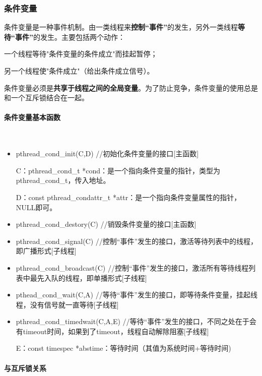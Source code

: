 \documentclass[UTF8]{article}%
\begin{document}
\subsubsection{条件变量}

条件变量是一种事件机制。由一类线程来\textbf{控制“事件”}的发生，另外一类线程\textbf{等待“事件”}的发生。主要包括两个动作：

一个线程等待"条件变量的条件成立"而挂起暂停；

另一个线程使"条件成立"（给出条件成立信号）。

条件变量必须是\textbf{共享于线程之间的全局变量}。为了防止竞争，条件变量的使用总是和一个互斥锁结合在一起。  

\paragraph{条件变量基本函数}~{}

\begin{itemize}
    \item pthread\_cond\_init(C,D) //初始化条件变量的接口[主函数]
    
    C：pthread\_cond\_t *cond：是一个指向条件变量的指针，类型为pthread\_cond\_t，传入地址。

    D：const pthread\_condattr\_t *attr：是一个指向条件变量属性的指针，NULL即可。

    \item pthread\_cond\_destory(C) //销毁条件变量的接口[主函数]
    \item pthread\_cond\_signal(C) //控制“事件”发生的接口，激活等待列表中的线程，即广播形式[子线程]
    \item pthread\_cond\_broadcast(C) //控制“事件”发生的接口，激活所有等待线程列表中最先入队的线程，即单播形式[子线程]
    \item pthead\_cond\_wait(C,A) //等待“事件”发生的接口，即等待条件变量，挂起线程，没有信号就一直等待[子线程]
    \item pthread\_cond\_timedwait(C,A,E) //等待“事件”发生的接口，不同之处在于会有timeout时间，如果到了timeout，线程自动解除阻塞[子线程]
    
    E：const timespec *abstime：等待时间（其值为系统时间+等待时间)

\end{itemize}

\paragraph{与互斥锁关系}~{}
\end{document}
